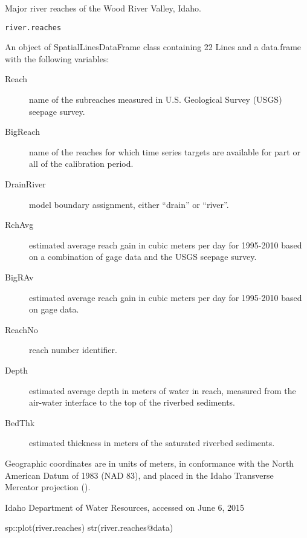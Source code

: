 \documentclass[a4paper]{book}
\begin{document}
%
\begin{Description}\relax
Major river reaches of the Wood River Valley, Idaho.
\end{Description}
%
\begin{Usage}
\begin{verbatim}
river.reaches
\end{verbatim}
\end{Usage}
%
\begin{Format}
An object of SpatialLinesDataFrame class containing 22 Lines and a
data.frame with the following variables:
\begin{description}

\item[Reach] name of the subreaches measured in U.S. Geological Survey (USGS)
seepage survey.
\item[BigReach] name of the reaches for which time series targets are available for
part or all of the calibration period.
\item[DrainRiver] model boundary assignment, either ``drain'' or ``river''.
\item[RchAvg] estimated average reach gain in cubic meters per day for 1995-2010
based on a combination of gage data and the USGS seepage survey.
\item[BigRAv] estimated average reach gain in cubic meters per day for 1995-2010
based on gage data.
\item[ReachNo] reach number identifier.
\item[Depth] estimated average depth in meters of water in reach,
measured from the air-water interface to the top of the riverbed sediments.
\item[BedThk] estimated thickness in meters of the saturated riverbed sediments.

\end{description}

Geographic coordinates are in units of meters, in conformance with the
North American Datum of 1983 (NAD 83), and placed in the
Idaho Transverse Mercator projection ().
\end{Format}
%
\begin{Source}\relax
Idaho Department of Water Resources, accessed on June 6, 2015
\end{Source}
%
\begin{Examples}
\begin{ExampleCode}
sp::plot(river.reaches)
str(river.reaches@data)

\end{ExampleCode}
\end{Examples}
\end{document}
